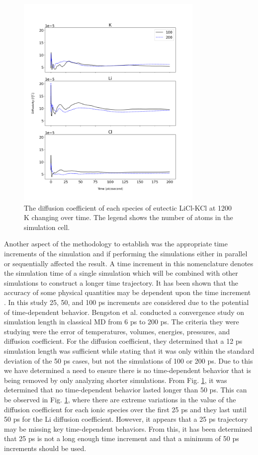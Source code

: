 \documentclass[review]{elsarticle}
\begin{document}
\begin{figure}[h!]
 \centering
 \includegraphics[width=0.8\textwidth]{100_vs_200_atoms.png} 
 \caption{The diffusion coefficient of each species of eutectic LiCl-KCl at 1200 K changing over time. The legend shows the number of atoms in the simulation cell.}
 \label{fig:100vs200}
\end{figure} 

Another aspect of the methodology to establish was the appropriate time increments of the simulation and if performing the simulations either in parallel or sequentially affected the result. A time increment in this nomenclature denotes the simulation time of a single simulation which will be combined with other simulations to construct a longer time trajectory. It has been shown that the accuracy of some physical quantities may be dependent upon the time increment \cite{Bengston2014}. In this study 25, 50, and 100 ps increments are considered due to the potential of time-dependent behavior. Bengston et al. \cite{Bengston2014} conducted a convergence study on simulation length in classical MD from 6 ps to 200 ps. The criteria they were studying were the error of temperatures, volumes, energies, pressures, and diffusion coefficient. For the diffusion coefficient, they determined that a 12 ps simulation length was sufficient while stating that it was only within the standard deviation of the 50 ps cases, but not the simulations of 100 or 200 ps. Due to this we have determined a need to ensure there is no time-dependent behavior that is being removed by only analyzing shorter simulations. From Fig. \ref{fig:100vs200}, it was determined that no time-dependent behavior lasted longer than 50 ps. This can be observed in Fig. \ref{fig:100vs200}, where there are extreme variations in the value of the diffusion coefficient for each ionic species over the first 25 ps and they last until 50 ps for the Li diffusion coefficient. However, it appears that a 25 ps trajectory may be missing key time-dependent behaviors. From this, it has been determined that 25 ps is not a long enough time increment and that a minimum of 50 ps increments should be used.
\end{document}
